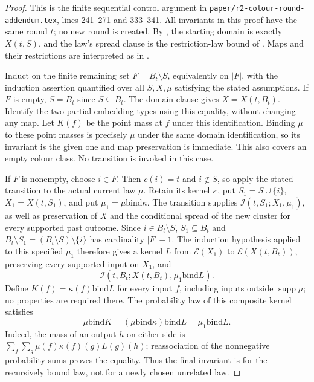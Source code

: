 \begin{proof}
This is the finite sequential control argument in
\texttt{paper/r2-colour-round-addendum.tex}, lines 241--271 and 333--341.
All invariants in this proof have the same round $t$; no new round is created.
By , the starting domain is exactly $X(t,S)$,
and the law's spread clause is the restriction-law bound of
.  Maps and their restrictions are interpreted as in
.

Induct on the finite remaining set $F=B_t\setminus S$, equivalently on
$|F|$, with the induction assertion quantified over all $S,X,\mu$ satisfying
the stated assumptions.  If $F$ is empty, $S=B_t$ since $S\subseteq B_t$.
The domain clause gives $X=X(t,B_t)$.  Identify the two partial-embedding
types using this equality, without changing any map.  Let $K(f)$ be the
point mass at $f$ under this identification.  Binding $\mu$ to these point
masses is precisely $\mu$ under the same domain identification, so its
invariant is the given one and map preservation is immediate.  This also
covers an empty colour class.  No transition is invoked in this case.

If $F$ is nonempty, choose $i\in F$.  Then $c(i)=t$ and $i\notin S$,
so apply the stated transition to the actual current law $\mu$.  Retain
its kernel $\kappa$, put $S_1=S\cup\{i\}$, $X_1=X(t,S_1)$, and put
$\mu_1=\mu\mathbin{\mathrm{bind}}\kappa$.
The transition supplies $\mathcal I(t,S_1;X_1,\mu_1)$, as well as preservation
of $X$ and the conditional spread of the new cluster for every supported
past outcome.  Since $i\in B_t\setminus S$, $S_1\subseteq B_t$ and
$B_t\setminus S_1=(B_t\setminus S)\setminus\{i\}$ has cardinality
$|F|-1$.  The induction hypothesis applied to this specified $\mu_1$
therefore gives a kernel $L$ from $\mathcal E(X_1)$ to
$\mathcal E(X(t,B_t))$, preserving every supported input on $X_1$, and
\[
 \mathcal I(t,B_t;X(t,B_t),\mu_1\mathbin{\mathrm{bind}}L).
\]
Define $K(f)=\kappa(f)\mathbin{\mathrm{bind}}L$ for every input $f$, including
inputs outside $\operatorname{supp}\mu$; no properties are required there.
The probability law of this composite kernel satisfies
\[
 \mu\mathbin{\mathrm{bind}}K
   =(\mu\mathbin{\mathrm{bind}}\kappa)\mathbin{\mathrm{bind}}L
   =\mu_1\mathbin{\mathrm{bind}}L.
\]
Indeed, the mass of an output $h$ on either side is
$\sum_f\sum_g\mu(f)\kappa(f)(g)L(g)(h)$; reassociation of the nonnegative
probability sums proves the equality.  Thus the final invariant is for
the recursively bound law, not for a newly chosen unrelated law.


\end{proof}
